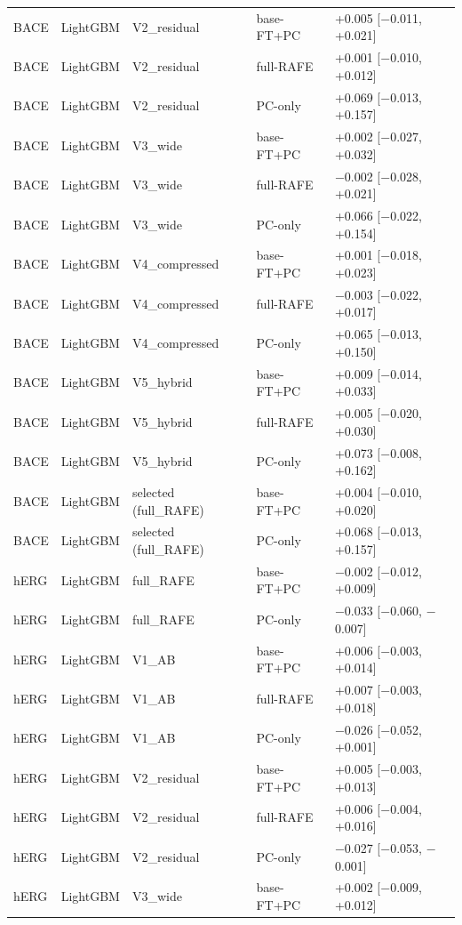 \begin{longtable}{lllp{2.6cm}p{4.2cm}}
BACE & LightGBM & V2\_residual & base-FT+PC & +0.005 [$-$0.011, +0.021] \\
BACE & LightGBM & V2\_residual & full-RAFE & +0.001 [$-$0.010, +0.012] \\
BACE & LightGBM & V2\_residual & PC-only & +0.069 [$-$0.013, +0.157] \\
BACE & LightGBM & V3\_wide & base-FT+PC & +0.002 [$-$0.027, +0.032] \\
BACE & LightGBM & V3\_wide & full-RAFE & $-$0.002 [$-$0.028, +0.021] \\
BACE & LightGBM & V3\_wide & PC-only & +0.066 [$-$0.022, +0.154] \\
BACE & LightGBM & V4\_compressed & base-FT+PC & +0.001 [$-$0.018, +0.023] \\
BACE & LightGBM & V4\_compressed & full-RAFE & $-$0.003 [$-$0.022, +0.017] \\
BACE & LightGBM & V4\_compressed & PC-only & +0.065 [$-$0.013, +0.150] \\
BACE & LightGBM & V5\_hybrid & base-FT+PC & +0.009 [$-$0.014, +0.033] \\
BACE & LightGBM & V5\_hybrid & full-RAFE & +0.005 [$-$0.020, +0.030] \\
BACE & LightGBM & V5\_hybrid & PC-only & +0.073 [$-$0.008, +0.162] \\
BACE & LightGBM & selected (full\_RAFE) & base-FT+PC & +0.004 [$-$0.010, +0.020] \\
BACE & LightGBM & selected (full\_RAFE) & PC-only & +0.068 [$-$0.013, +0.157] \\
hERG & LightGBM & full\_RAFE & base-FT+PC & $-$0.002 [$-$0.012, +0.009] \\
hERG & LightGBM & full\_RAFE & PC-only & $-$0.033 [$-$0.060, $-$0.007] \\
hERG & LightGBM & V1\_AB & base-FT+PC & +0.006 [$-$0.003, +0.014] \\
hERG & LightGBM & V1\_AB & full-RAFE & +0.007 [$-$0.003, +0.018] \\
hERG & LightGBM & V1\_AB & PC-only & $-$0.026 [$-$0.052, +0.001] \\
hERG & LightGBM & V2\_residual & base-FT+PC & +0.005 [$-$0.003, +0.013] \\
hERG & LightGBM & V2\_residual & full-RAFE & +0.006 [$-$0.004, +0.016] \\
hERG & LightGBM & V2\_residual & PC-only & $-$0.027 [$-$0.053, $-$0.001] \\
hERG & LightGBM & V3\_wide & base-FT+PC & +0.002 [$-$0.009, +0.012] \\

\end{longtable}
